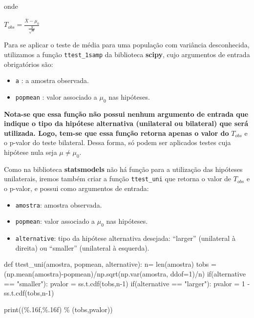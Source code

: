 \documentclass[
  letterpaper,
  DIV=11,
  numbers=noendperiod]{scrreprt}
\newenvironment{Shaded}{\begin{snugshade}}{\end{snugshade}}
\newcommand{\BuiltInTok}[1]{\textcolor[rgb]{0.00,0.23,0.31}{#1}}
\newcommand{\ControlFlowTok}[1]{\textcolor[rgb]{0.00,0.23,0.31}{#1}}
\newcommand{\DecValTok}[1]{\textcolor[rgb]{0.68,0.00,0.00}{#1}}
\newcommand{\KeywordTok}[1]{\textcolor[rgb]{0.00,0.23,0.31}{#1}}
\newcommand{\NormalTok}[1]{\textcolor[rgb]{0.00,0.23,0.31}{#1}}
\newcommand{\OperatorTok}[1]{\textcolor[rgb]{0.37,0.37,0.37}{#1}}
\newcommand{\SpecialCharTok}[1]{\textcolor[rgb]{0.37,0.37,0.37}{#1}}
\newcommand{\StringTok}[1]{\textcolor[rgb]{0.13,0.47,0.30}{#1}}
\providecommand{\tightlist}{%
  \setlength{\itemsep}{0pt}\setlength{\parskip}{0pt}}\usepackage{longtable,booktabs,array}
\begin{document}
onde

\(T_{obs} = \frac{\bar{X}-\mu_{0}}{\frac{S}{\sqrt{n}}}\)

Para se aplicar o teste de média para uma população com variância
desconhecida, utilizamos a função \texttt{ttest\_1samp} da biblioteca
\textbf{scipy}, cujo argumentos de entrada obrigatórios são:

\begin{itemize}
\tightlist
\item
  \texttt{a} : a amostra observada.
\item
  \texttt{popmean} : valor associado a \(\mu_{0}\) nas hipóteses.
\end{itemize}

\textbf{Nota-se que essa função não possui nenhum argumento de entrada
que indique o tipo da hipótese alternativa (unilateral ou bilateral) que
será utilizada. Logo, tem-se que essa função retorna apenas o valor do}
\(T_{obs}\) e o p-valor do teste bilateral. Dessa forma, só podem ser
aplicados testes cuja hipótese nula seja \(\mu \neq \mu_{0}\).

Como na biblioteca \textbf{statsmodels} não há função para a utilização
das hipóteses unilaterais, iremos também criar a função
\texttt{ttest\_uni} que retorna o valor de \(T_{obs}\) e o p-valor, e
possui como argumentos de entrada:

\begin{itemize}
\tightlist
\item
  \texttt{amostra}: amostra observada.
\item
  \texttt{popmean}: valor associado a \(\mu_{0}\) nas hipóteses.
\item
  \texttt{alternative}: tipo da hipótese alternativa desejada:
  ``larger'' (unilateral à direita) ou ``smaller'' (unilateral à
  esquerda).
\end{itemize}

\begin{Shaded}
\begin{Highlighting}[]
\KeywordTok{def}\NormalTok{ ttest\_uni(amostra, popmean, alternative):}
\NormalTok{    n}\OperatorTok{=} \BuiltInTok{len}\NormalTok{(amostra)}
\NormalTok{    tobs }\OperatorTok{=}\NormalTok{ (np.mean(amostra)}\OperatorTok{{-}}\NormalTok{popmean)}\OperatorTok{/}\NormalTok{np.sqrt(np.var(amostra, ddof}\OperatorTok{=}\DecValTok{1}\NormalTok{)}\OperatorTok{/}\NormalTok{n)}
    \ControlFlowTok{if}\NormalTok{(alternative }\OperatorTok{==} \StringTok{"smaller"}\NormalTok{):}
\NormalTok{        pvalor }\OperatorTok{=}\NormalTok{ ss.t.cdf(tobs,n}\OperatorTok{{-}}\DecValTok{1}\NormalTok{)}
    \ControlFlowTok{if}\NormalTok{(alternative }\OperatorTok{==} \StringTok{"larger"}\NormalTok{):}
\NormalTok{        pvalor }\OperatorTok{=} \DecValTok{1} \OperatorTok{{-}}\NormalTok{ ss.t.cdf(tobs,n}\OperatorTok{{-}}\DecValTok{1}\NormalTok{)}
    
    \BuiltInTok{print}\NormalTok{(}\StringTok{\textquotesingle{}(}\SpecialCharTok{\%.16f}\StringTok{,}\SpecialCharTok{\%.16f}\StringTok{)\textquotesingle{}} \OperatorTok{\%}\NormalTok{ (tobs,pvalor))}
\end{Highlighting}
\end{Shaded}
\end{document}
